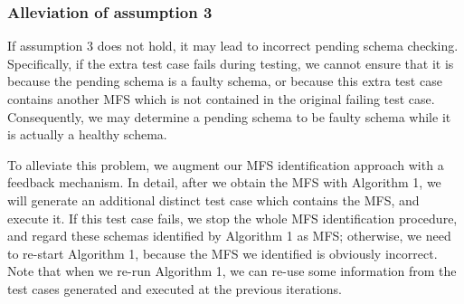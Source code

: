 \documentclass{sig-alternate-05-2015}
\begin{document}
{{\subsubsection{Alleviation of assumption 3}

If assumption 3 does not hold, it may lead to incorrect pending schema checking. Specifically, if the extra test case fails during testing, we cannot ensure that it is because the pending schema is a faulty schema, or because this extra test case contains another MFS which is not contained in the original failing test case. Consequently, we may determine a pending schema to be faulty schema while it is actually a healthy schema.

To alleviate this problem, we augment our MFS identification approach with a feedback mechanism. In detail, after we obtain the MFS with Algorithm 1, we will generate an additional distinct test case which contains the MFS, and execute it. If this test case fails, we stop the whole MFS identification procedure, and regard these schemas identified by Algorithm 1 as MFS; otherwise, we need to re-start Algorithm 1, because the MFS we identified is obviously incorrect. Note that when we re-run Algorithm 1, we can re-use some information from the test cases generated and executed at the previous iterations.

%

%

}}
\end{document}
